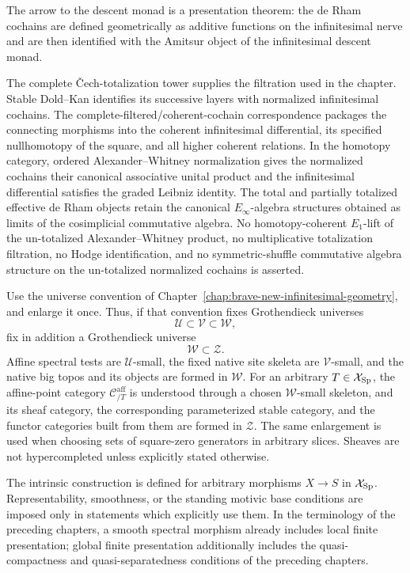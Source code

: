 The arrow to the descent monad is a presentation theorem: the de Rham
cochains are defined geometrically as additive functions on the infinitesimal
nerve and are then identified with the Amitsur object of the infinitesimal
descent monad.

The complete \v{C}ech-totalization tower supplies the filtration used in the
chapter.  Stable Dold--Kan identifies its successive layers with normalized
infinitesimal cochains.  The complete-filtered/coherent-cochain correspondence
packages the connecting morphisms into the coherent infinitesimal
differential, its specified nullhomotopy of the square, and all higher coherent
relations.  In the homotopy category, ordered Alexander--Whitney normalization
gives the normalized cochains their canonical associative unital product and
the infinitesimal differential satisfies the graded Leibniz identity.  The
total and partially totalized effective de Rham objects retain the canonical
\(E_\infty\)-algebra structures obtained as limits of the cosimplicial
commutative algebra.  No homotopy-coherent \(E_1\)-lift of the un-totalized
Alexander--Whitney product, no multiplicative totalization filtration, no
Hodge identification, and no symmetric-shuffle commutative algebra structure
on the un-totalized normalized cochains is asserted.

\begin{convention}
\label{conv:monadic-de-rham-universes}
Use the universe convention of
Chapter~\ref{chap:brave-new-infinitesimal-geometry}, and enlarge it once.
Thus, if that convention fixes Grothendieck universes
\[
    \mathcal U\subset\mathcal V\subset\mathcal W,
\]
fix in addition a Grothendieck universe
\[
    \mathcal W\subset\mathcal Z.
\]
Affine spectral tests are \(\mathcal U\)-small, the fixed native site skeleta
are \(\mathcal V\)-small, and the native big topos and its objects are formed
in \(\mathcal W\).  For an arbitrary \(T\in\mathcal X_{\mathrm{Sp}}\), the
affine-point category \(\mathcal C^{\mathrm{aff}}_{/T}\) is understood through
a chosen \(\mathcal W\)-small skeleton, and its sheaf category, the
corresponding parameterized stable category, and the functor categories built
from them are formed in \(\mathcal Z\).  The same enlargement is used when
choosing sets of square-zero generators in arbitrary slices.  Sheaves are not
hypercompleted unless explicitly stated otherwise.
\end{convention}

\begin{convention}
\label{conv:monadic-de-rham-scope}
The intrinsic construction is defined for arbitrary morphisms \(X\to S\) in
\(\mathcal X_{\mathrm{Sp}}\).  Representability, smoothness, or the standing motivic
base conditions are imposed only in statements which explicitly use them.  In
the terminology of the preceding chapters, a smooth spectral morphism already
includes local finite presentation; global finite presentation additionally
includes the quasi-compactness and quasi-separatedness conditions of the
preceding chapters.
\end{convention}

